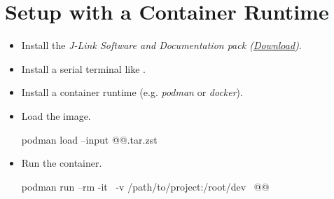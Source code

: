 \section{Setup with a Container Runtime}

\begin{itemize}
  \item Install the \emph{J-Link Software and Documentation pack (\href{https://www.segger.com/downloads/jlink}{Download})}.
  \item Install a serial terminal like .
  \item Install a container runtime (e.g. \emph{podman} or \emph{docker}).
  \item Load the image.
        \begin{monobox}
podman load --input @\imagename{}@.tar.zst
\end{monobox}
  \item Run the container.
        \begin{monobox}
podman run --rm -it \
  -v /path/to/project:/root/dev \
  @\imagename{}@
\end{monobox}
\end{itemize}
